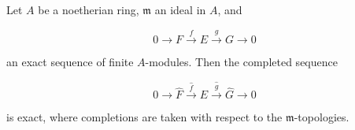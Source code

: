 Let $A$ be a noetherian ring, $\mathfrak{m}$ an ideal in $A$, and

$$0 \to F \xrightarrow{f} E \xrightarrow{g} G \to 0$$

an exact sequence of finite $A$-modules. Then the completed sequence

$$0 \to \hat{F} \xrightarrow{\hat{f}} \hat{E} \xrightarrow{\hat{g}} \hat{G} \to 0$$

is exact, where completions are taken with respect to the $\mathfrak{m}$-topologies.
